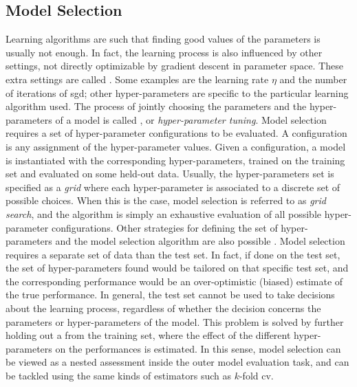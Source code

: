 \subsection{Model Selection}
Learning algorithms are such that finding good values of the parameters is usually not enough. In fact, the learning process is also influenced by other settings, not directly optimizable by gradient descent in parameter space. These extra settings are called . Some examples are the learning rate $\eta$ and the number of iterations of \gls{sgd}; other hyper-parameters are specific to the particular learning algorithm used. The process of jointly choosing the parameters and the hyper-parameters of a model is called , or \emph{hyper-parameter tuning}. Model selection requires a set of hyper-parameter configurations to be evaluated. A configuration is any assignment of the hyper-parameter values. Given a configuration, a model is instantiated with the corresponding hyper-parameters, trained on the training set and evaluated on some held-out data. Usually, the hyper-parameters set is specified as a \emph{grid} where each hyper-parameter is associated to a discrete set of possible choices. When this is the case, model selection is referred to as \emph{grid search}, and the algorithm is simply an exhaustive evaluation of all possible hyper-parameter configurations. Other strategies for defining the set of hyper-parameters and the model selection algorithm are also possible \citep{bergstra2009randomsearch,bergstra2012hyperopt}. Model selection requires a separate set of data than the test set. In fact, if done on the test set, the set of hyper-parameters found would be tailored on that specific test set, and the corresponding performance would be an over-optimistic (biased) estimate of the true performance. In general, the test set cannot be used to take decisions about the learning process, regardless of whether the decision concerns the parameters or hyper-parameters of the model. This problem is solved by further holding out a  from the training set, where the effect of the different hyper-parameters on the performances is estimated. In this sense, model selection can be viewed as a nested assessment inside the outer model evaluation task, and can be tackled using the same kinds of estimators such as $k$-fold \gls{cv}.

